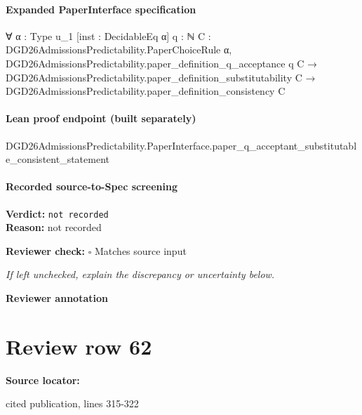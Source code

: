 \documentclass[10pt]{article}
\newcommand{\reviewerbox}{%
  \par\noindent\fbox{\parbox{0.96\linewidth}{\rule{0pt}{0.38in}}}\par
}
\newcommand{\reviewmatch}[1]{%
  \par\noindent\textbf{Reviewer check:} $\square$\; #1\par
  \noindent\emph{If left unchecked, explain the discrepancy or uncertainty below.}\par
}
\begin{document}
\paragraph{Expanded PaperInterface specification}
\begin{ReviewVerbatim}
∀ {α : Type u_1} [inst : DecidableEq α] {q : ℕ} {C : DGD26AdmissionsPredictability.PaperChoiceRule α},
  DGD26AdmissionsPredictability.paper_definition_q_acceptance q C →
    DGD26AdmissionsPredictability.paper_definition_substitutability C →
      DGD26AdmissionsPredictability.paper_definition_consistency C
\end{ReviewVerbatim}

\paragraph{Lean proof endpoint (built separately)}\begin{ReviewVerbatim}
DGD26AdmissionsPredictability.PaperInterface.paper_q_acceptant_substitutable_consistent_statement
\end{ReviewVerbatim}

\paragraph{Recorded source-to-Spec screening}
\textbf{Verdict:} \texttt{not recorded}
\\
\textbf{Reason:} not recorded
\reviewmatch{Matches source input}
\noindent\textbf{Reviewer annotation}\par
\reviewerbox
\clearpage
\hypertarget{source-claim-7c749451f4caf111}{}
\section*{Review row 62}
\textbf{Source locator:} {\footnotesize\raggedright cited publication, lines 315-\allowbreak{}322\par}
\end{document}
